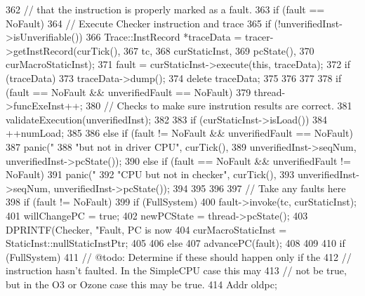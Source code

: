 \begin{DoxyCode}
{{362         // that the instruction is properly marked as a fault.
363         if (fault == NoFault) {
364             // Execute Checker instruction and trace
365             if (!unverifiedInst->isUnverifiable()) {
366                 Trace::InstRecord *traceData = tracer->getInstRecord(curTick(),
367                                                            tc,
368                                                            curStaticInst,
369                                                            pcState(),
370                                                            curMacroStaticInst);
371                 fault = curStaticInst->execute(this, traceData);
372                 if (traceData) {
373                     traceData->dump();
374                     delete traceData;
375                 }
376             }
377 
378             if (fault == NoFault && unverifiedFault == NoFault) {
379                 thread->funcExeInst++;
380                 // Checks to make sure instrution results are correct.
381                 validateExecution(unverifiedInst);
382 
383                 if (curStaticInst->isLoad()) {
384                     ++numLoad;
385                 }
386             } else if (fault != NoFault && unverifiedFault == NoFault) {
387                 panic("%
388                       "but not in driver CPU\n", curTick(),
389                       unverifiedInst->seqNum, unverifiedInst->pcState());
390             } else if (fault == NoFault && unverifiedFault != NoFault) {
391                 panic("%
392                       "CPU but not in checker\n", curTick(),
393                       unverifiedInst->seqNum, unverifiedInst->pcState());
394             }
395         }
396 
397         // Take any faults here
398         if (fault != NoFault) {
399             if (FullSystem) {
400                 fault->invoke(tc, curStaticInst);
401                 willChangePC = true;
402                 newPCState = thread->pcState();
403                 DPRINTF(Checker, "Fault, PC is now %
404                 curMacroStaticInst = StaticInst::nullStaticInstPtr;
405             }
406         } else {
407            advancePC(fault);
408         }
409 
410         if (FullSystem) {
411             // @todo: Determine if these should happen only if the
412             // instruction hasn't faulted.  In the SimpleCPU case this may
413             // not be true, but in the O3 or Ozone case this may be true.
414             Addr oldpc;
}}}
\end{DoxyCode}
